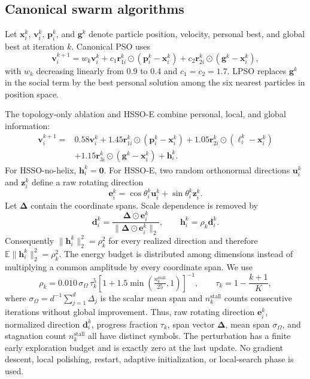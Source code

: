 \documentclass[10pt]{article}
\begin{document}
\subsection{Canonical swarm algorithms}

Let $\bm{x}_i^k$, $\bm{v}_i^k$, $\bm{p}_i^k$, and $\bm{g}^k$ denote particle position, velocity, personal best, and global best at iteration $k$. Canonical PSO uses
\begin{equation}
 \bm{v}_i^{k+1}=w_k\bm{v}_i^k+c_1\bm{r}_{1i}^k\odot(\bm{p}_i^k-\bm{x}_i^k)
 +c_2\bm{r}_{2i}^k\odot(\bm{g}^k-\bm{x}_i^k),
\end{equation}
with $w_k$ decreasing linearly from 0.9 to 0.4 and $c_1=c_2=1.7$. LPSO replaces $\bm{g}^k$ in the social term by the best personal solution among the six nearest particles in position space.

The topology-only ablation and HSSO-E combine personal, local, and global information:
\begin{align}
 \bm{v}_i^{k+1}={}&0.58\bm{v}_i^k+1.45\bm{r}_{1i}^k\odot(\bm{p}_i^k-\bm{x}_i^k)
 +1.05\bm{r}_{2i}^k\odot(\bm{\ell}_i^k-\bm{x}_i^k)\nonumber\\
 &+1.15\bm{r}_{3i}^k\odot(\bm{g}^k-\bm{x}_i^k)+\bm{h}_i^k.
\end{align}
For HSSO-no-helix, $\bm{h}_i^k=\bm{0}$. For HSSO-E, two random orthonormal directions $\bm{u}_i^k$ and $\bm{z}_i^k$ define a raw rotating direction
\begin{equation}
 \bm{e}_i^k=\cos\theta_i^k\bm{u}_i^k+\sin\theta_i^k\bm{z}_i^k.
\end{equation}
Let $\bm{\Delta}$ contain the coordinate spans. Scale dependence is removed by
\begin{equation}
 \bm{d}_i^k=\frac{\bm{\Delta}\odot\bm{e}_i^k}{\|\bm{\Delta}\odot\bm{e}_i^k\|_2},\qquad
 \bm{h}_i^k=\rho_k\bm{d}_i^k.
\end{equation}
Consequently $\|\bm{h}_i^k\|_2^2=\rho_k^2$ for every realized direction and therefore $\mathbb{E}\|\bm{h}_i^k\|_2^2=\rho_k^2$. The energy budget is distributed among dimensions instead of multiplying a common amplitude by every coordinate span. We use
\begin{equation}
 \rho_k=0.010\,\sigma_{\Omega}\,\tau_k^5
 \left[1+1.5\min\left(\tfrac{n_k^{\mathrm{stall}}}{25},1\right)\right]^{-1},
 \qquad \tau_k=1-\frac{k+1}{K},
\end{equation}
where $\sigma_{\Omega}=d^{-1}\sum_{j=1}^{d}\Delta_j$ is the scalar mean span and $n_k^{\mathrm{stall}}$ counts consecutive iterations without global improvement. Thus, raw rotating direction $\bm e_i^k$, normalized direction $\bm d_i^k$, progress fraction $\tau_k$, span vector $\bm\Delta$, mean span $\sigma_\Omega$, and stagnation count $n_k^{\mathrm{stall}}$ all have distinct symbols. The perturbation has a finite early exploration budget and is exactly zero at the last update. No gradient descent, local polishing, restart, adaptive initialization, or local-search phase is used.
\end{document}
